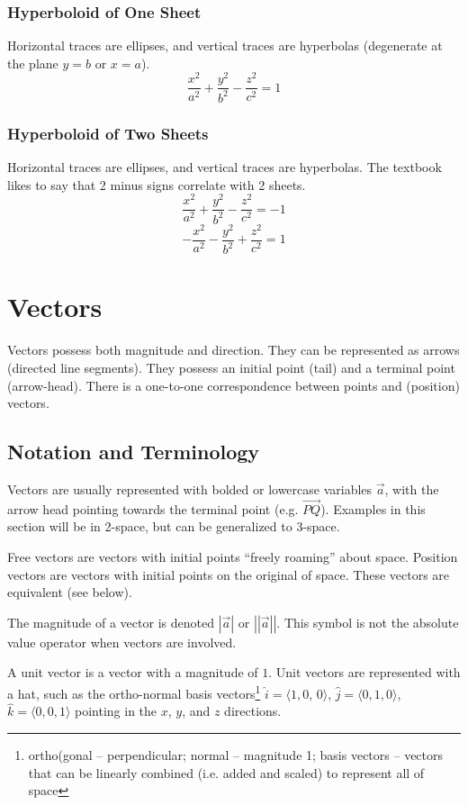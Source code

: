 \documentclass{article}
\begin{document}
\subsubsection{Hyperboloid of One Sheet}
Horizontal traces are ellipses, and vertical traces are hyperbolas (degenerate at the plane $y=b$ or $x=a$).
$$\frac{x^2}{a^2} + \frac{y^2}{b^2} - \frac{z^2}{c^2}=1$$

\subsubsection{Hyperboloid of Two Sheets}
Horizontal traces are ellipses, and vertical traces are hyperbolas. The textbook likes to say that 2 minus signs correlate with 2 sheets.
$$\frac{x^2}{a^2} + \frac{y^2}{b^2} - \frac{z^2}{c^2}= -1$$
$$-\frac{x^2}{a^2} - \frac{y^2}{b^2} + \frac{z^2}{c^2}= 1$$

\section{Vectors}

Vectors possess both magnitude and direction. They can be represented as arrows (directed line segments). They possess an initial point (tail) and a terminal point (arrow-head).
There is a one-to-one correspondence between points and (position) vectors.

\subsection{Notation and Terminology}
Vectors are usually represented with bolded or lowercase variables $\Vec{a}$, with the arrow head pointing towards the terminal point (e.g. $\overrightarrow{PQ}$). Examples in this section will be in 2-space, but can be generalized to 3-space.

Free vectors are vectors with initial points ``freely roaming'' about space. Position vectors are vectors with initial points on the original of space. These vectors are equivalent (see below).

The magnitude of a vector is denoted $\left|\Vec{a}\right|$ or $\left|\left|\Vec{a}\right|\right|$. This symbol is not the absolute value operator when vectors are involved.

A unit vector is a vector with a magnitude of $1$. Unit vectors are represented with a hat, such as the ortho-normal basis vectors\footnote{ortho(gonal -- perpendicular; normal -- magnitude 1; basis vectors -- vectors that can be linearly combined (i.e. added and scaled) to represent all of space} $\hat{i} = \langle1, 0$, $0\rangle$, $\hat{j} = \langle 0, 1, 0 \rangle$, $\hat{k} = \langle 0, 0, 1 \rangle$ pointing in the $x$, $y$, and $z$ directions.
\end{document}
